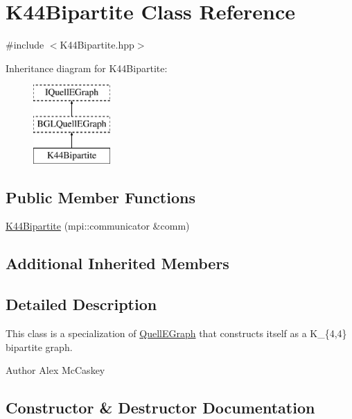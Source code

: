 \hypertarget{a00082}{}\section{K44\+Bipartite Class Reference}
\label{a00082}


{\ttfamily \#include $<$K44\+Bipartite.\+hpp$>$}

Inheritance diagram for K44\+Bipartite\+:\begin{figure}[H]
\begin{center}
\leavevmode
\includegraphics[height=3.000000cm]{a00082}
\end{center}
\end{figure}
\subsection*{Public Member Functions}
\begin{DoxyCompactItemize}
\item 
\hyperlink{a00082_a21dbec576f813853ea035eba8330c63c}{K44\+Bipartite} (mpi\+::communicator \&comm)
\end{DoxyCompactItemize}
\subsection*{Additional Inherited Members}


\subsection{Detailed Description}
This class is a specialization of \hyperlink{a00100}{Quell\+E\+Graph} that constructs itself as a K\+\_\+\{4,4\} bipartite graph.

\begin{DoxyAuthor}{Author}
Alex Mc\+Caskey 
\end{DoxyAuthor}


\subsection{Constructor \& Destructor Documentation}
